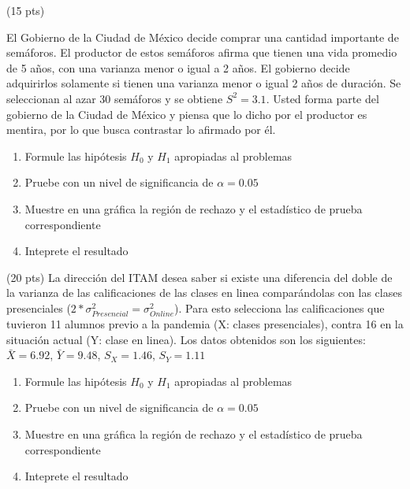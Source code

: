 \documentclass[addpoints]{exam}
\theoremstyle{mytheor}
\begin{document}
  
\begin{questions} 

 
 
 \question (15 pts)

El Gobierno de la Ciudad de México decide comprar una cantidad importante de semáforos. El productor de estos semáforos afirma que tienen una vida promedio de 5 años, con una varianza menor o igual a 2 años. El gobierno decide adquirirlos solamente si tienen una varianza menor o igual 2 años de duración. Se seleccionan al azar 30 semáforos y se obtiene $S^2 = 3.1$. Usted forma parte del gobierno de la Ciudad de México y piensa que lo dicho por el productor es mentira, por lo que busca contrastar lo afirmado por él.

\begin{enumerate}
\item Formule las hipótesis $H_0$ y $H_1$ apropiadas al problemas
\item Pruebe con un nivel de significancia de $\alpha = 0.05$
\item Muestre en una gráfica la región de rechazo y el estadístico de prueba correspondiente
\item Inteprete el resultado
\end{enumerate}

\question (20 pts)
La dirección del ITAM desea saber si existe una diferencia del doble de la varianza de las calificaciones de las clases en linea comparándolas con las clases presenciales ($2*\sigma^2_{Presencial} = \sigma^2_{Online}$). Para esto selecciona las calificaciones que tuvieron 11 alumnos previo a la pandemia (X: clases presenciales), contra 16 en la situación actual (Y: clase en linea). Los datos obtenidos son los siguientes: $\bar{X} = 6.92$, $\bar{Y} = 9.48$, $S_{X} = 1.46$, $S_{Y} = 1.11$

\begin{enumerate}
\item Formule las hipótesis $H_0$ y $H_1$ apropiadas al problemas
\item Pruebe con un nivel de significancia de $\alpha = 0.05$
\item Muestre en una gráfica la región de rechazo y el estadístico de prueba correspondiente
\item Inteprete el resultado
\end{enumerate}


\end{questions}
\end{document}
